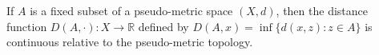 If $A$ is a fixed subset of a pseudo-metric space $(X,d)$, then the distance function $D(A,\cdot) : X \to \mathbb{R}$ defined by $D(A,x) = \inf \{d(x,z) : z \in A\}$ is continuous relative to the pseudo-metric topology.
